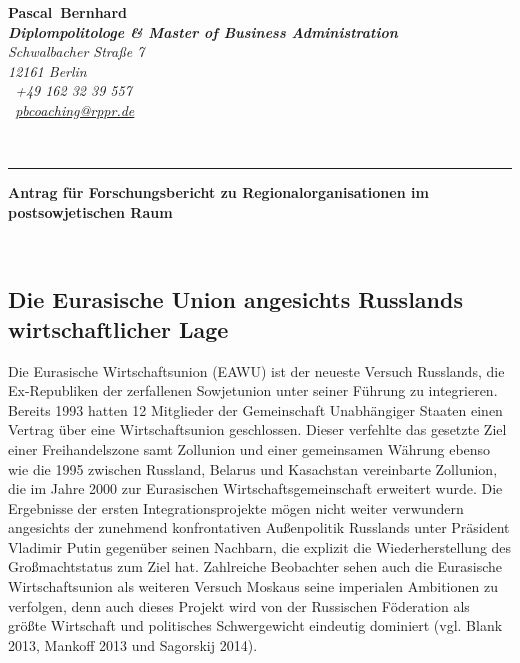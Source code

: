 \documentclass[11pt,a4paper]{article}
\def\firstname{Pascal}
\def\familyname{Bernhard}
\begin{document}
\sffamily   %
\hfill%
\begin{minipage}[t]{.6\textwidth}
\raggedleft%
	{\bfseries {\color{firstnamecolor}\firstname}~{\color{bluecolor}\familyname}}\\[.35ex]
	\small\itshape%
	\textbf{Diplompolitologe \& Master of Business Administration}\\
	Schwalbacher Straße 7\\
	12161 Berlin\\[.35ex]
	\Mobilefone~+49 162 32 39 557 \\
	\Letter~\href{mailto:pbcoaching@rppr.de}{pbcoaching@rppr.de}

\end{minipage}\\[0.5em]
%
{\color{firstnamecolor}\rule{\textwidth}{.25ex}}
%
\begin{minipage}[t]{.4\textwidth}
	\raggedright%
	\vspace*{1em}
	\textbf{\color{bluecolor} {\Large Antrag für Forschungsbericht zu Regionalorganisationen im postsowjetischen Raum}} \\
	\small%

\end{minipage}
%
\hfill
%
\begin{minipage}[t]{.4\textwidth}
	\raggedleft %
\end{minipage}\\[2.2em]



\subsection*{\color{yellowcolor} Die Eurasische Union angesichts Russlands wirtschaftlicher Lage}


Die Eurasische Wirtschaftsunion (EAWU) ist der neueste Versuch Russlands, die Ex-Republiken der zerfallenen Sowjetunion unter seiner Führung zu integrieren. Bereits 1993 hatten 12 Mitglieder der Gemeinschaft Unabhängiger Staaten einen Vertrag über eine Wirtschaftsunion geschlossen. Dieser verfehlte das gesetzte Ziel einer Freihandelszone samt Zollunion und einer gemeinsamen Währung ebenso wie die 1995 zwischen Russland, Belarus und Kasachstan vereinbarte Zollunion, die im Jahre 2000 zur Eurasischen Wirtschaftsgemeinschaft erweitert wurde. Die Ergebnisse der ersten Integrationsprojekte mögen nicht weiter verwundern angesichts der zunehmend konfrontativen Außenpolitik Russlands unter Präsident Vladimir Putin gegenüber seinen Nachbarn, die explizit die Wiederherstellung des Großmachtstatus zum Ziel hat. Zahlreiche Beobachter sehen auch die Eurasische Wirtschaftsunion als weiteren Versuch Moskaus seine imperialen Ambitionen zu verfolgen, denn auch dieses Projekt wird von der Russischen Föderation als größte Wirtschaft und politisches Schwergewicht eindeutig dominiert (vgl. Blank 2013, Mankoff 2013 und Sagorskij 2014).
\end{document}
